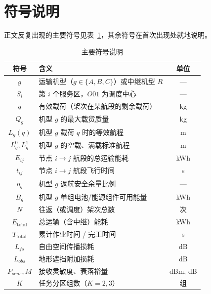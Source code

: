 \section{符号说明}

正文反复出现的主要符号见表~\ref{tab:symbols}，其余符号在首次出现处就地说明。

\begin{table}[htbp]
\centering
\caption{主要符号说明}
\label{tab:symbols}
\renewcommand{\arraystretch}{1.25}
\begin{tabular}{c|l|c}
\toprule
\textbf{符号} & \textbf{含义} & \textbf{单位} \\
\midrule
$g$ & 运输机型（$g\in\{A,B,C\}$）或中继机型 $R$ & --- \\
$S_i$ & 第 $i$ 个服务区，$O01$ 为调度中心 & --- \\
$q$ & 有效载荷（架次在某航段的剩余载荷） & kg \\
$Q_g$ & 机型 $g$ 的最大载货质量 & kg \\
$L_g(q)$ & 机型 $g$ 载荷 $q$ 时的等效航程 & m \\
$L_g^{0},L_g^{1}$ & 机型 $g$ 的空载、满载标准航程 & m \\
$E_{ij}$ & 节点 $i\to j$ 航段的总运输能耗 & kWh \\
$t_{ij}$ & 节点 $i\to j$ 航段飞行时间 & s \\
$\eta_g$ & 机型 $g$ 返航安全余量比例 & --- \\
$B_g$ & 机型 $g$ 单组电池/能源组件可用能量 & kWh \\
$N$ & 往返（或调度）架次总数 & 次 \\
$E_{\text{total}}$ & 总运输（含中继）能耗 & kWh \\
$T_{\text{total}}$ & 累计作业时间 / 完工时间 & s \\
$L_{fs}$ & 自由空间传播损耗 & dB \\
$L_{obs}$ & 地形遮挡附加损耗 & dB \\
$P_{sens},M$ & 接收灵敏度、衰落裕量 & dBm, dB \\
$K$ & 任务分区组数（$K=2,3$） & 组 \\
\bottomrule
\end{tabular}
\end{table}
